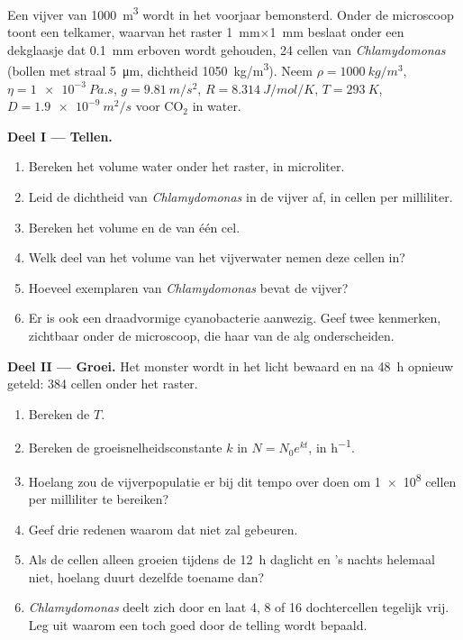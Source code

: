 \begin{problem}
\label{pb:b2:unicellular-diversity:1}
Een vijver van \qty{1000}{m^3} wordt in het voorjaar bemonsterd. Onder de
microscoop toont een telkamer, waarvan het raster \qty{1}{mm}$\times$\qty{1}{mm}
beslaat onder een dekglaasje dat \qty{0.1}{mm} erboven wordt gehouden,
24 cellen van \emph{Chlamydomonas} (bollen met straal \qty{5}{\micro m},
dichtheid \qty{1050}{kg/m^3}). Neem $\rho = \qty{1000}{kg/m^3}$,
$\eta = \qty{1e-3}{Pa.s}$, $g = \qty{9.81}{m/s^2}$, $R =
\qty{8.314}{J/mol/K}$, $T = \qty{293}{K}$, $D = \qty{1.9e-9}{m^2/s}$
voor $\mathrm{CO_2}$ in water.

\medskip
\noindent\textbf{Deel I --- Tellen.}
\begin{enumerate}
  \item Bereken het volume water onder het raster, in microliter.
  \item Leid de dichtheid van \emph{Chlamydomonas} in de vijver af, in
        cellen per milliliter.
  \item Bereken het volume en de  van één
        cel.
  \item Welk deel van het volume van het vijverwater nemen deze cellen
        in?
  \item Hoeveel exemplaren van \emph{Chlamydomonas} bevat de vijver?
  \item Er is ook een draadvormige cyanobacterie aanwezig. Geef twee
        kenmerken, zichtbaar onder de microscoop, die haar van de alg
        onderscheiden.
\end{enumerate}

\medskip
\noindent\textbf{Deel II --- Groei.}
Het monster wordt in het licht bewaard en na \qty{48}{h} opnieuw geteld:
\num{384} cellen onder het raster.
\begin{enumerate}[resume]
  \item Bereken de  $T$.
  \item Bereken de groeisnelheidsconstante $k$ in $N = N_0 e^{kt}$, in
        \unit{h^{-1}}.
  \item Hoelang zou de vijverpopulatie er bij dit tempo over doen om
        \qty{1e8}{} cellen per milliliter te bereiken?
  \item Geef drie redenen waarom dat niet zal gebeuren.
  \item Als de cellen alleen groeien tijdens de \qty{12}{h} daglicht en
        's nachts helemaal niet, hoelang duurt dezelfde toename dan?
  \item \emph{Chlamydomonas} deelt zich door  en laat
        4, 8 of 16 dochtercellen tegelijk vrij. Leg uit waarom een
         toch goed door de telling wordt bepaald.
\end{enumerate}


\end{problem}
